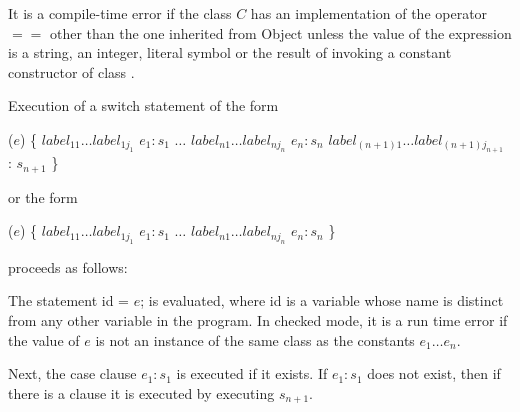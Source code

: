\documentclass{article}
\newcommand{\code}[1]{{\sf #1}}
\begin{document}
\begin{itemize}

\LMHash{}
It is a compile-time error if the class $C$ has an implementation of the operator $==$ other than the one inherited from \code{Object} unless the value of the expression is a string, an integer, literal symbol or the result of invoking a constant constructor of class .



\LMHash{}
Execution of a switch statement of the form

\begin{dartCode}
\SWITCH{} ($e$) \{
   $label_{11} \ldots label_{1j_1}$ \CASE{} $e_1: s_1$
   $\ldots$
   $label_{n1} \ldots label_{nj_n}$ \CASE{} $e_n: s_n$
   $label_{(n+1)1} \ldots label_{(n+1)j_{n+1}}$ \DEFAULT{}: $s_{n+1}$
\}
\end{dartCode}

or the form

\begin{dartCode}
\SWITCH{} ($e$) \{
   $label_{11} \ldots label_{1j_1}$ \CASE{} $e_1: s_1$
   $\ldots$
   $label_{n1} \ldots label_{nj_n}$ \CASE{} $e_n: s_n$
\}
\end{dartCode}

proceeds as follows:

\LMHash{}
The statement \code{\VAR{} id = $e$;} is evaluated, where \code{id} is a variable whose name is distinct from any other variable in the program. In checked mode, it is a run time error if the value of $e$ is not an instance of the same class as the constants $e_1 \ldots e_n$.


\LMHash{}
Next, the case clause \CASE{} $e_{1}: s_{1}$ is executed if it exists. If \CASE{} $e_{1}: s_{1}$ does not exist, then if there is a  \DEFAULT{} clause it is executed by executing $s_{n+1}$.


\end{itemize}
\end{document}
